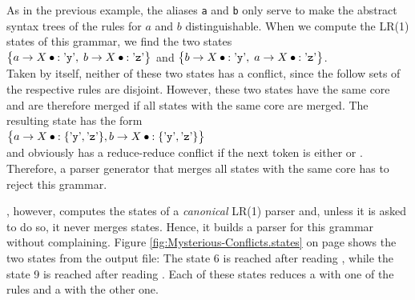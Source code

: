 \noindent
As in the previous example, the aliases \texttt{a} and \texttt{b} only serve to make the abstract syntax trees of
the rules for $a$ and $b$ distinguishable.  When we compute the LR(1) states of this grammar, we find the two states
\\[0.2cm]
\hspace*{1.3cm}
$\bigl\{ a \rightarrow X \mdot: \saquoted{y},\;
         b \rightarrow X \mdot: \saquoted{z}
\bigr\}$
\quad and \quad
$\bigl\{ b \rightarrow X \mdot: \saquoted{y},\;
         a \rightarrow X \mdot: \saquoted{z}
\bigr\}$.
\\[0.2cm]
Taken by itself, neither of these two states has a conflict, since the follow sets of the respective rules are
disjoint.  However, these two states have the same core and are therefore merged if all states with the same
core are merged.  The resulting state has the form
\\[0.2cm]
\hspace*{1.3cm}
$\bigl\{ a \rightarrow X \mdot:\{\saquoted{y}, \saquoted{z} \},
         b \rightarrow X \mdot:\{\saquoted{y}, \saquoted{z} \}
\bigr\}$
\\[0.2cm]
and obviously has a reduce-reduce conflict if the next token is either  or .
Therefore, a parser generator that merges all states with the same core has to reject this grammar.

, however, computes the states of a \emph{canonical} LR(1) parser and, unless it is asked
to do so, it never merges states.
Hence, it builds a parser for this grammar without complaining.  Figure \ref{fig:Mysterious-Conflicts.states}
on page \pageref{fig:Mysterious-Conflicts.states} shows the two states from the output file:  The state 6 is
reached after reading , while the state 9 is reached after reading .  Each of these states
reduces a  with one of the rules and a  with the other one.

